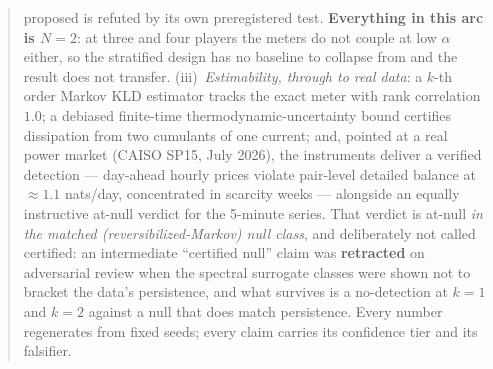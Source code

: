 \documentclass[11pt]{article}
\begin{document}
\begin{abstract}
proposed is refuted by its own preregistered test. \textbf{Everything in this arc is
$N=2$}: at three and four players the meters do not couple at low $\alpha$
either, so the stratified design has no baseline to collapse from and the
result does not transfer.
(iii)~\emph{Estimability, through to real data}: a $k$-th order Markov KLD
estimator tracks the exact meter with rank correlation $1.0$; a debiased
finite-time thermodynamic-uncertainty bound certifies dissipation from two
cumulants of one current; and, pointed at a real power market (CAISO SP15,
July 2026), the instruments deliver a verified detection --- day-ahead hourly
prices violate pair-level detailed balance at $\approx 1.1$ nats/day,
concentrated in scarcity weeks --- alongside an equally instructive at-null
verdict for the 5-minute series. That verdict is at-null \emph{in the matched
(reversibilized-Markov) null class}, and deliberately not called certified: an
intermediate ``certified null'' claim was \textbf{retracted} on adversarial
review when the spectral surrogate classes were shown not to bracket the data's
persistence, and what survives is a no-detection at $k=1$ and $k=2$ against a
null that does match persistence.
Every number regenerates from fixed seeds; every claim carries its confidence
tier and its falsifier.
\end{abstract}









\end{document}
